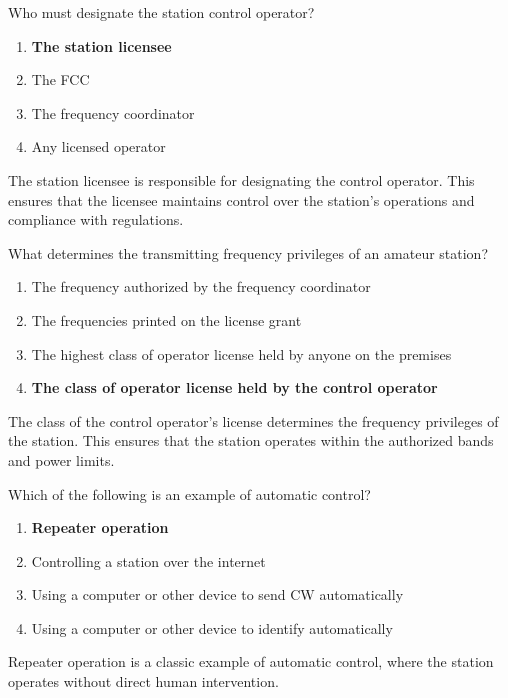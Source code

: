 
\begin{tcolorbox}[colback=gray!10!white,colframe=black!75!black,title={T1E03}]
    Who must designate the station control operator?
    \begin{enumerate}[label=\Alph*),noitemsep]
        \item \textbf{The station licensee}
        \item The FCC
        \item The frequency coordinator
        \item Any licensed operator
    \end{enumerate}
\end{tcolorbox}
The station licensee is responsible for designating the control operator. This ensures that the licensee maintains control over the station's operations and compliance with regulations.


\begin{tcolorbox}[colback=gray!10!white,colframe=black!75!black,title={T1E04}]
    What determines the transmitting frequency privileges of an amateur station?
    \begin{enumerate}[label=\Alph*),noitemsep]
        \item The frequency authorized by the frequency coordinator
        \item The frequencies printed on the license grant
        \item The highest class of operator license held by anyone on the premises
        \item \textbf{The class of operator license held by the control operator}
    \end{enumerate}
\end{tcolorbox}
The class of the control operator's license determines the frequency privileges of the station. This ensures that the station operates within the authorized bands and power limits.


\begin{tcolorbox}[colback=gray!10!white,colframe=black!75!black,title={T1E08}]
    Which of the following is an example of automatic control?
    \begin{enumerate}[label=\Alph*),noitemsep]
        \item \textbf{Repeater operation}
        \item Controlling a station over the internet
        \item Using a computer or other device to send CW automatically
        \item Using a computer or other device to identify automatically
    \end{enumerate}
\end{tcolorbox}
Repeater operation is a classic example of automatic control, where the station operates without direct human intervention.

